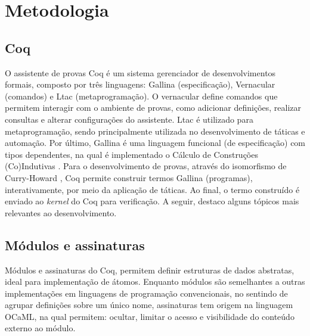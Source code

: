\chapter{Metodologia}\label{chp:metodologia}

\section{Coq}
O assistente de provas Coq \cite{Coq2021} é um sistema gerenciador de desenvolvimentos formais, composto por três linguagens: Gallina (especificação), Vernacular (comandos) e Ltac (metaprogramação). O vernacular define comandos que permitem interagir com o ambiente de provas, como adicionar definições, realizar consultas e alterar configurações do assistente. Ltac é utilizado para metaprogramação, sendo principalmente utilizada no desenvolvimento de táticas e automação. Por último, Gallina é uma linguagem funcional (de especificação) com tipos dependentes, na qual é implementado o Cálculo de Construções (Co)Indutivas \cite{Coquand1988,Coquand1990,PaulinMohring1993}. Para o desenvolvimento de provas, através do isomorfismo de Curry-Howard \cite{Soerensen2006}, Coq permite construir termos Gallina (programas), interativamente, por meio da aplicação de táticas. Ao final, o termo construído é enviado ao \textit{kernel} do Coq para verificação. A seguir, destaco alguns tópicos mais relevantes ao desenvolvimento.

\section{Módulos e assinaturas}
Módulos e assinaturas do Coq, permitem definir estruturas de dados abstratas, ideal para implementação de átomos. Enquanto módulos são semelhantes a outras implementações em linguagens de programação convencionais, no sentindo de agrupar definições sobre um único nome, assinaturas tem origem na linguagem OCaML, na qual permitem: ocultar, limitar o acesso e visibilidade do conteúdo externo ao módulo.

